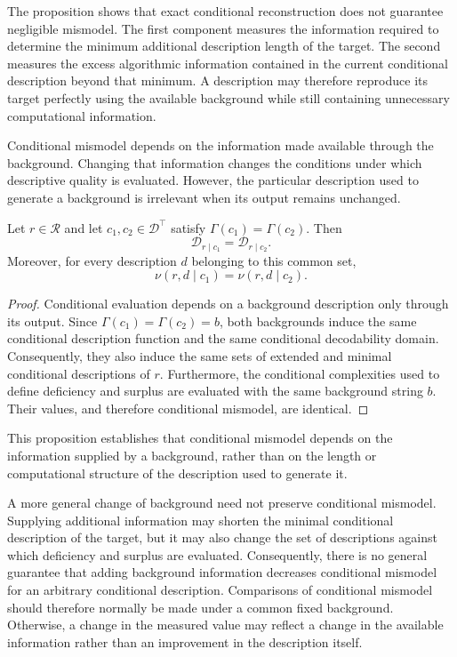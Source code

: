 The proposition shows that exact conditional reconstruction does not guarantee negligible mismodel. The first component measures the information required to determine the minimum additional description length of the target. The second measures the excess algorithmic information contained in the current conditional description beyond that minimum. A description may therefore reproduce its target perfectly using the available background while still containing unnecessary computational information.

Conditional mismodel depends on the information made available through the background. Changing that information changes the conditions under which descriptive quality is evaluated. However, the particular description used to generate a background is irrelevant when its output remains unchanged.

\begin{proposition}
\label{prop:conditional_mismodel_background_equivalence}
Let $r\in\mathcal R$ and let $c_1,c_2\in\mathcal D^\top$ satisfy $\Gamma(c_1)=\Gamma(c_2)$. Then
\[
\mathcal D_{r\mid c_1} = \mathcal D_{r\mid c_2}.
\]
Moreover, for every description $d$ belonging to this common set,
\[
\nu(r,d\mid c_1)=\nu(r,d\mid c_2).
\]
\end{proposition}
\begin{proof}
Conditional evaluation depends on a background description only through its output. Since $\Gamma(c_1) = \Gamma(c_2) = b$, both backgrounds induce the same conditional description function and the same conditional decodability domain. Consequently, they also induce the same sets of extended and minimal conditional descriptions of $r$. Furthermore, the conditional complexities used to define deficiency and surplus are evaluated with the same background string $b$. Their values, and therefore conditional mismodel, are identical.
\end{proof}

This proposition establishes that conditional mismodel depends on the information supplied by a background, rather than on the length or computational structure of the description used to generate it.

A more general change of background need not preserve conditional mismodel. Supplying additional information may shorten the minimal conditional description of the target, but it may also change the set of descriptions against which deficiency and surplus are evaluated. Consequently, there is no general guarantee that adding background information decreases conditional mismodel for an arbitrary conditional description. Comparisons of conditional mismodel should therefore normally be made under a common fixed background. Otherwise, a change in the measured value may reflect a change in the available information rather than an improvement in the description itself.


